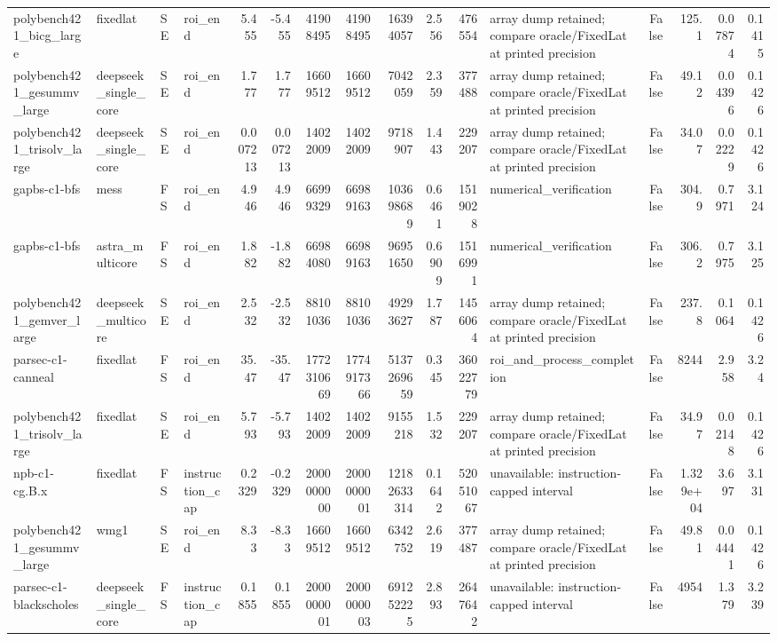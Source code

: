 \begin{tabular}{llllrrrrrrrlrrrr}
polybench421\_bicg\_large & fixedlat & SE & roi\_end & 5.455 & -5.455 & 41908495 & 41908495 & 16394057 & 2.556 & 476554 & array dump retained; compare oracle/FixedLat at printed precision & False & 125.1 & 0.07874 & 0.1415 \\
polybench421\_gesummv\_large & deepseek\_single\_core & SE & roi\_end & 1.777 & 1.777 & 16609512 & 16609512 & 7042059 & 2.359 & 377488 & array dump retained; compare oracle/FixedLat at printed precision & False & 49.12 & 0.04396 & 0.1426 \\
polybench421\_trisolv\_large & deepseek\_single\_core & SE & roi\_end & 0.007213 & 0.007213 & 14022009 & 14022009 & 9718907 & 1.443 & 229207 & array dump retained; compare oracle/FixedLat at printed precision & False & 34.07 & 0.02229 & 0.1426 \\
gapbs-c1-bfs & mess & FS & roi\_end & 4.946 & 4.946 & 66999329 & 66989163 & 103698689 & 0.6461 & 1519028 & numerical\_verification & False & 304.9 & 0.7971 & 3.124 \\
gapbs-c1-bfs & astra\_multicore & FS & roi\_end & 1.882 & -1.882 & 66984080 & 66989163 & 96951650 & 0.6909 & 1516991 & numerical\_verification & False & 306.2 & 0.7975 & 3.125 \\
polybench421\_gemver\_large & deepseek\_multicore & SE & roi\_end & 2.532 & -2.532 & 88101036 & 88101036 & 49293627 & 1.787 & 1456064 & array dump retained; compare oracle/FixedLat at printed precision & False & 237.8 & 0.1064 & 0.1426 \\
parsec-c1-canneal & fixedlat & FS & roi\_end & 35.47 & -35.47 & 1772310669 & 1774917366 & 5137269659 & 0.345 & 36022779 & roi\_and\_process\_completion & False & 8244 & 2.958 & 3.24 \\
polybench421\_trisolv\_large & fixedlat & SE & roi\_end & 5.793 & -5.793 & 14022009 & 14022009 & 9155218 & 1.532 & 229207 & array dump retained; compare oracle/FixedLat at printed precision & False & 34.97 & 0.02148 & 0.1426 \\
npb-c1-cg.B.x & fixedlat & FS & instruction\_cap & 0.2329 & -0.2329 & 2000000000 & 2000000001 & 12182633314 & 0.1642 & 52051067 & unavailable: instruction-capped interval & False & 1.329e+04 & 3.697 & 3.131 \\
polybench421\_gesummv\_large & wmg1 & SE & roi\_end & 8.33 & -8.33 & 16609512 & 16609512 & 6342752 & 2.619 & 377487 & array dump retained; compare oracle/FixedLat at printed precision & False & 49.81 & 0.04441 & 0.1426 \\
parsec-c1-blackscholes & deepseek\_single\_core & FS & instruction\_cap & 0.1855 & 0.1855 & 2000000001 & 2000000003 & 691252225 & 2.893 & 2647642 & unavailable: instruction-capped interval & False & 4954 & 1.379 & 3.239 \\

\end{tabular}
